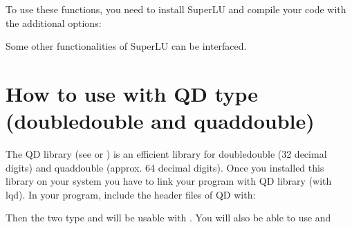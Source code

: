 \documentclass[a4paper,11pt,english]{sphinxmanual}
\begin{document}
To use these functions, you need to install SuperLU and compile your code with the additional options:

\begin{sphinxVerbatim}[commandchars=\\\{\}]
      
\end{sphinxVerbatim}

Some other functionalities of SuperLU can be interfaced.


\chapter{How to use  with QD type (double\sphinxhyphen{}double and quad\sphinxhyphen{}double)}
\label{\detokenize{gmm/qd:how-to-use-gmm-with-qd-type-double-double-and-quad-double}}\label{\detokenize{gmm/qd:gmm-qd}}\label{\detokenize{gmm/qd::doc}}
The QD library (see  or ) is an efficient library for double\sphinxhyphen{}double (32 decimal digits) and quad\sphinxhyphen{}double (approx. 64 decimal digits). Once you installed this library on your system you have to link your program with QD library (with \sphinxhyphen{}lqd). In your program, include the header files of QD with:

\begin{sphinxVerbatim}[commandchars=\\\{\}]
 
 
 
\end{sphinxVerbatim}

Then the two type  and  will be usable with . You will also be able to use  and 
\end{document}
